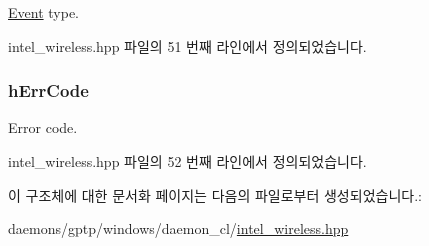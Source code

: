 \hyperlink{class_event}{Event} type. 



intel\+\_\+wireless.\+hpp 파일의 51 번째 라인에서 정의되었습니다.

\subsubsection[{\texorpdfstring{h\+Err\+Code}{hErrCode}}]{ h\+Err\+Code}\hypertarget{struct_i_n_t_e_l___e_v_e_n_t_a173bc1d75833b72f9f73122e7d9b74e6}{}\label{struct_i_n_t_e_l___e_v_e_n_t_a173bc1d75833b72f9f73122e7d9b74e6}


Error code. 



intel\+\_\+wireless.\+hpp 파일의 52 번째 라인에서 정의되었습니다.



이 구조체에 대한 문서화 페이지는 다음의 파일로부터 생성되었습니다.\+:\begin{DoxyCompactItemize}
\item 
daemons/gptp/windows/daemon\+\_\+cl/\hyperlink{intel__wireless_8hpp}{intel\+\_\+wireless.\+hpp}\end{DoxyCompactItemize}
